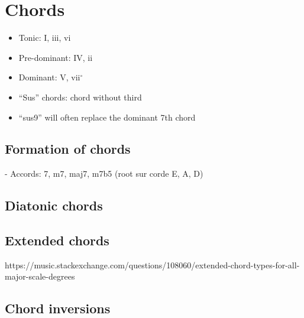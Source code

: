 \documentclass{article}
\begin{document}
\section{Chords}

\begin{itemize}
	\item Tonic: I, iii, vi
	\item Pre-dominant: IV, ii
	\item Dominant: V, vii$^\circ$
\end{itemize}


\begin{itemize}
	\item ``Sus'' chords: chord without third
	\item ``sus9'' will often replace the dominant 7th chord
\end{itemize}

\newpage
\subsection{Formation of chords}



- Accords: 7, m7, maj7, m7b5 (root sur corde E, A, D)


\newpage
\subsection{Diatonic chords}




\subsection{Extended chords}

https://music.stackexchange.com/questions/108060/extended-chord-types-for-all-major-scale-degrees

\newpage
\subsection{Chord inversions}
\end{document}
